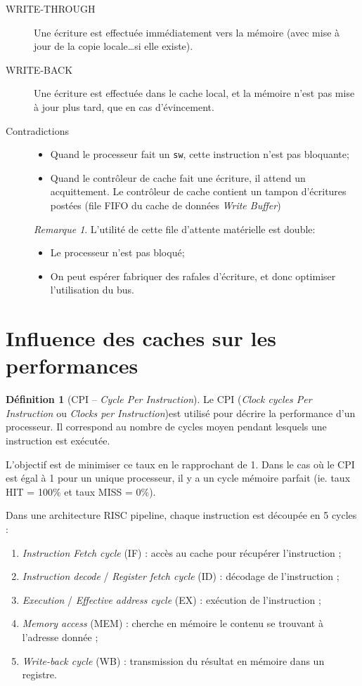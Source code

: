 \documentclass[11pt,english,french]{scrreprt}
\theoremstyle{remark}
\newtheorem*{rem*}{Remarque}
\theoremstyle{definition}
\newtheorem*{def*}{Définition}
\begin{document}
\begin{description}
	\item [WRITE-THROUGH] Une écriture est effectuée immédiatement vers la
	  mémoire (avec mise à jour de la copie locale\dots si elle existe).
	  \item[WRITE-BACK] Une écriture est effectuée dans le cache local, et la
	  mémoire n'est pas mise à jour plus tard, que en cas d'évincement.
	  \item[Contradictions] \hfill \begin{itemize}
			\item Quand le processeur fait un \lstinline!sw!, cette instruction n'est pas bloquante;
			\item Quand le contrôleur de cache fait une écriture, il attend un acquittement. Le contrôleur de cache contient un tampon d'écritures postées (file FIFO du cache de données \emph{Write Buffer})
		\end{itemize}
		\begin{rem*}
			L'utilité de cette file d'attente matérielle est double: \begin{itemize}
				\item Le processeur n'est pas bloqué;
				\item On peut espérer fabriquer des rafales d'écriture, et donc optimiser  l'utilisation du bus.
			\end{itemize}
		\end{rem*}
\end{description}

\section{Influence des caches sur les performances} %

\begin{def*}[CPI -- \emph{Cycle Per Instruction}]
	Le CPI (\emph{Clock cycles Per Instruction} ou \emph{Clocks per Instruction})est utilisé pour décrire la performance d'un processeur. Il correspond au nombre de cycles moyen pendant lesquels une instruction est exécutée.
	
	L'objectif est de minimiser ce taux en le rapprochant de 1. Dans le cas où le CPI est égal à 1 pour un unique processeur, il y a un cycle mémoire parfait (ie. taux HIT = 100\% et taux MISS = 0\%).
\end{def*}

Dans une architecture RISC pipeline, chaque instruction est découpée en 5 cycles : \begin{enumerate}
	\item \emph{Instruction Fetch cycle} (IF) : accès au cache pour récupérer l'instruction ;
	\item \emph{Instruction decode} / \emph{Register fetch cycle} (ID) : décodage de l'instruction ;
	\item \emph{Execution} / \emph{Effective address cycle} (EX) : exécution de l'instruction ;
	\item \emph{Memory access} (MEM) : cherche en mémoire le contenu se trouvant à l'adresse donnée ;
	\item \emph{Write-back cycle} (WB) : transmission du résultat en mémoire dans un registre.
\end{enumerate}
\end{document}
